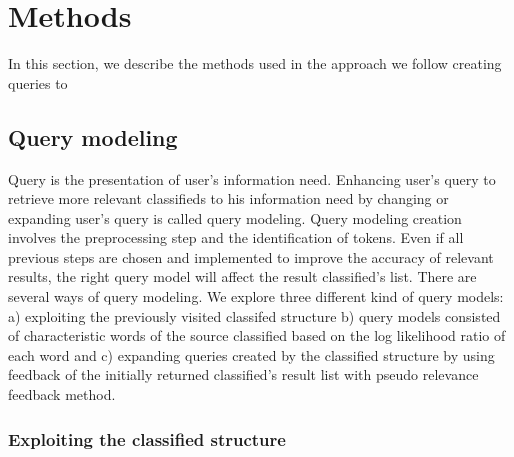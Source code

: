 \chapter{Methods}

In this section, we describe the methods used in the approach we follow creating queries to 

\section{Query modeling}

Query is the presentation of user's information need. Enhancing user's query to retrieve more relevant classifieds to his information need by changing or expanding user's query is called query modeling. Query modeling creation involves the preprocessing step and the identification of tokens. Even if all previous steps are chosen and implemented to improve the accuracy of relevant results, the right query model will affect the result classified's list. There are several ways of query modeling. We explore three different kind of query models: a) exploiting the previously visited classifed structure b) query models consisted of characteristic words of the source classified based on the log likelihood ratio of each word and c) expanding queries created by the classified structure by using feedback of the initially returned classified's result list with pseudo relevance feedback method.

\subsection{Exploiting the classified structure}

